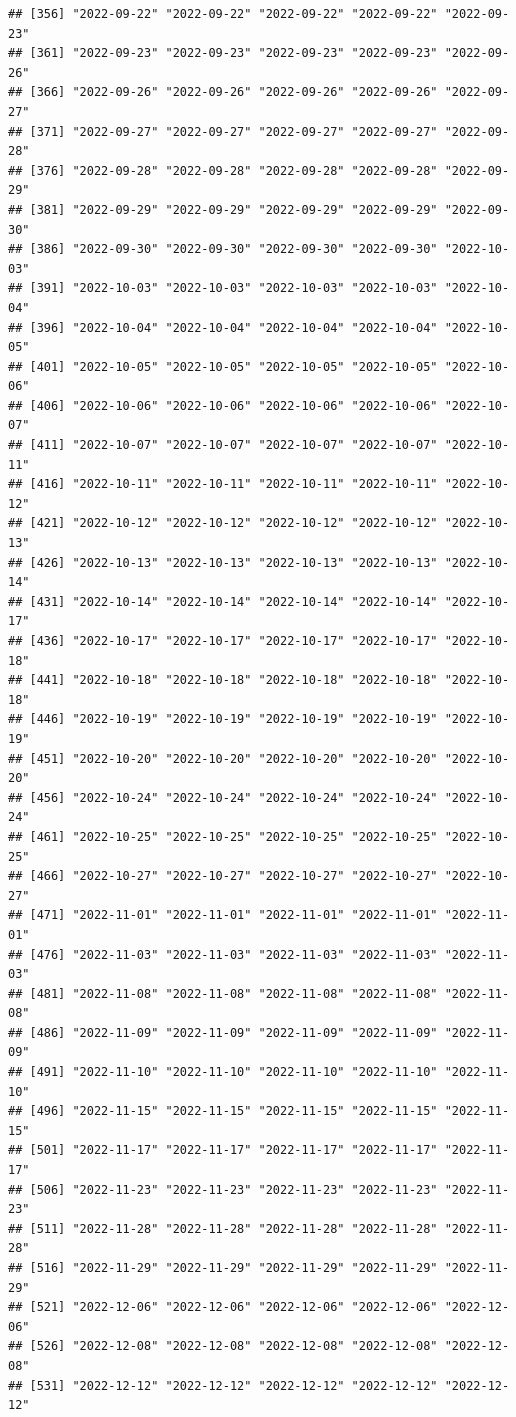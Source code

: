 \documentclass[
]{article}
\begin{document}
\begin{verbatim}
## [356] "2022-09-22" "2022-09-22" "2022-09-22" "2022-09-22" "2022-09-23"
## [361] "2022-09-23" "2022-09-23" "2022-09-23" "2022-09-23" "2022-09-26"
## [366] "2022-09-26" "2022-09-26" "2022-09-26" "2022-09-26" "2022-09-27"
## [371] "2022-09-27" "2022-09-27" "2022-09-27" "2022-09-27" "2022-09-28"
## [376] "2022-09-28" "2022-09-28" "2022-09-28" "2022-09-28" "2022-09-29"
## [381] "2022-09-29" "2022-09-29" "2022-09-29" "2022-09-29" "2022-09-30"
## [386] "2022-09-30" "2022-09-30" "2022-09-30" "2022-09-30" "2022-10-03"
## [391] "2022-10-03" "2022-10-03" "2022-10-03" "2022-10-03" "2022-10-04"
## [396] "2022-10-04" "2022-10-04" "2022-10-04" "2022-10-04" "2022-10-05"
## [401] "2022-10-05" "2022-10-05" "2022-10-05" "2022-10-05" "2022-10-06"
## [406] "2022-10-06" "2022-10-06" "2022-10-06" "2022-10-06" "2022-10-07"
## [411] "2022-10-07" "2022-10-07" "2022-10-07" "2022-10-07" "2022-10-11"
## [416] "2022-10-11" "2022-10-11" "2022-10-11" "2022-10-11" "2022-10-12"
## [421] "2022-10-12" "2022-10-12" "2022-10-12" "2022-10-12" "2022-10-13"
## [426] "2022-10-13" "2022-10-13" "2022-10-13" "2022-10-13" "2022-10-14"
## [431] "2022-10-14" "2022-10-14" "2022-10-14" "2022-10-14" "2022-10-17"
## [436] "2022-10-17" "2022-10-17" "2022-10-17" "2022-10-17" "2022-10-18"
## [441] "2022-10-18" "2022-10-18" "2022-10-18" "2022-10-18" "2022-10-18"
## [446] "2022-10-19" "2022-10-19" "2022-10-19" "2022-10-19" "2022-10-19"
## [451] "2022-10-20" "2022-10-20" "2022-10-20" "2022-10-20" "2022-10-20"
## [456] "2022-10-24" "2022-10-24" "2022-10-24" "2022-10-24" "2022-10-24"
## [461] "2022-10-25" "2022-10-25" "2022-10-25" "2022-10-25" "2022-10-25"
## [466] "2022-10-27" "2022-10-27" "2022-10-27" "2022-10-27" "2022-10-27"
## [471] "2022-11-01" "2022-11-01" "2022-11-01" "2022-11-01" "2022-11-01"
## [476] "2022-11-03" "2022-11-03" "2022-11-03" "2022-11-03" "2022-11-03"
## [481] "2022-11-08" "2022-11-08" "2022-11-08" "2022-11-08" "2022-11-08"
## [486] "2022-11-09" "2022-11-09" "2022-11-09" "2022-11-09" "2022-11-09"
## [491] "2022-11-10" "2022-11-10" "2022-11-10" "2022-11-10" "2022-11-10"
## [496] "2022-11-15" "2022-11-15" "2022-11-15" "2022-11-15" "2022-11-15"
## [501] "2022-11-17" "2022-11-17" "2022-11-17" "2022-11-17" "2022-11-17"
## [506] "2022-11-23" "2022-11-23" "2022-11-23" "2022-11-23" "2022-11-23"
## [511] "2022-11-28" "2022-11-28" "2022-11-28" "2022-11-28" "2022-11-28"
## [516] "2022-11-29" "2022-11-29" "2022-11-29" "2022-11-29" "2022-11-29"
## [521] "2022-12-06" "2022-12-06" "2022-12-06" "2022-12-06" "2022-12-06"
## [526] "2022-12-08" "2022-12-08" "2022-12-08" "2022-12-08" "2022-12-08"
## [531] "2022-12-12" "2022-12-12" "2022-12-12" "2022-12-12" "2022-12-12"

\end{verbatim}
\end{document}
